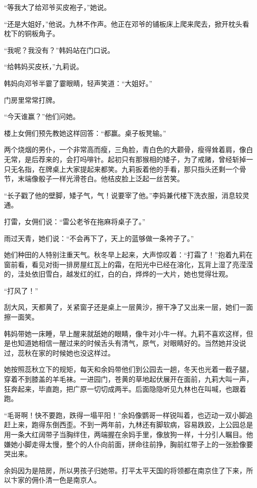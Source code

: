 \par “等我大了给邓爷买皮袍子，”她说。
\par “还是大姐好，”他说。九林不作声。他正在邓爷的铺板床上爬来爬去，掀开枕头看枕下的铜板角子。
\par “我呢？我没有？”韩妈站在门口说。
\par “给韩妈买皮袄，”九莉说。
\par 韩妈向邓爷半霎了霎眼睛，轻声笑道：“大姐好。”
\par 门房里常常打牌。
\par “今天谁赢？”他们问她。
\par 楼上女佣们预先教她这样回答：“都赢。桌子板凳输。”
\par 两个烧烟的男仆，一个非常高而瘦，三角脸，青白色的大颧骨，瘦得耸着肩，像白无常，是后荐来的，会打吗啡针。起初只有那猴相的矮子，为了戒赌，曾经斩掉一只无名指，在牌桌上大家提起来都笑。九莉扳着他的手看，那只指头还剩一个骨节，末端像骰子一样光滑苍白。他桔皮脸上泛起一丝苦笑。
\par “长子戳了他的壁脚，矮子气，气！说要宰了他。”李妈兼代楼下洗衣服，消息较灵通。
\par 打雷，女佣们说：“雷公老爷在拖麻将桌子了。”
\par 雨过天青，她们说：“不会再下了，天上的蓝够做一条袴子了。”
\par 她们种田的人特别注重天气。秋冬早上起来，大声惊叹着：“打霜了！”抱着九莉在窗前看，看见对街一排房屋红瓦上的霜，在阳光中已经在溶化，瓦背上湿了亮滢滢的，洼处依旧雪白，越发红的红，白的白，烨烨的一大片，她也觉得壮观。
\par “打风了！”
\par 刮大风，天都黄了，关紧窗子还是桌上一层黄沙，擦干净了又出来一层，她们一面擦一面笑。
\par 韩妈带她一床睡，早上醒来就舐她的眼睛，像牛对小牛一样。九莉不喜欢这样，但是也知道她相信一醒过来的时候舌头有清气，原气，对眼睛好的。当然她并没说过，蕊秋在家的时候她也没这样过。
\par 她按照蕊秋立下的规矩，每天和余妈带他们到公园去一趟，冬天也光着一截子腿，穿着不到膝盖的羊毛袜。一进园门，苍黄的草地起伏展开在面前，九莉大叫一声，狂奔起来，毕直跑，把广原一切切成两半。后面隐隐听见九林也在叫喊，也跟着跑。
\par “毛哥啊！快不要跑，跌得一塌平阳！”余妈像鹦哥一样锐叫着，也迈动一双小脚追赶上来，跑得东倒西歪。不到一两年前，九林还有脚软病，容易跌跤，上公园总是用一条大红阔带子当胸绊住，两端握在余妈手里，像放狗一样，十分引人瞩目。他嫌她小脚走得太慢，整个的人仆向前面，拼命往前挣，胸前红带子上的一张脸像要哭出来。
\par 余妈因为是陪房，所以男孩子归她带。打平太平天国的将领都在南京住了下来，所以卞家的佣仆清一色是南京人。
